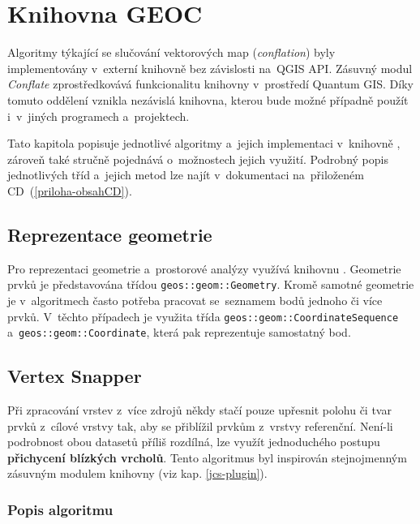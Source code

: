 \chapter{Knihovna GEOC}
\label{5-geoc}

Algoritmy týkající se slučování vektorových map (\textit{conflation}) byly
implementovány v~externí knihovně  bez závislosti na~QGIS API. 
Zásuvný modul \textit{Conflate} zprostředkovává funkcionalitu knihovny 
v~prostředí Quantum GIS. Díky tomuto oddělení vznikla nezávislá knihovna, 
kterou bude možné případně použít i~v~jiných programech a~projektech.

Tato kapitola popisuje jednotlivé algoritmy a~jejich implementaci v~knihovně
, zároveň také stručně pojednává o~možnostech  jejich využití.
Podrobný popis jednotlivých tříd a~jejich metod lze najít
v~dokumentaci na~přiloženém CD~(\ref{priloha-obsahCD}). 


\section{Reprezentace geometrie}
\label{reprezentace-geom}

Pro reprezentaci geometrie a~prostorové analýzy  využívá
knihovnu . Geometrie prvků je představována třídou 
\texttt{geos::geom::Geometry}. Kromě samotné geometrie je v~algoritmech
často potřeba pracovat se~seznamem bodů jednoho či více prvků. V~těchto
případech je využita třída \texttt{geos::geom::CoordinateSequence}
a~\texttt{geos::geom::Coordinate}, která pak reprezentuje samostatný bod.


\section{Vertex Snapper} 
\label{vertexsnapper}

Při zpracování vrstev z~více zdrojů někdy stačí pouze upřesnit polohu či tvar 
prvků z~cílové vrstvy tak, aby se přiblížil prvkům z~vrstvy referenční. 
\mbox{Není-li} podrobnost obou datasetů příliš rozdílná, lze využít jednoduchého 
postupu \textbf{přichycení blízkých vrcholů}. Tento algoritmus byl inspirován
stejnojmenným zásuvným mo\-dulem knihovny  (viz kap. \ref{jcs-plugin}).


\subsection{Popis algoritmu}
\label{vs-algoritmus}

